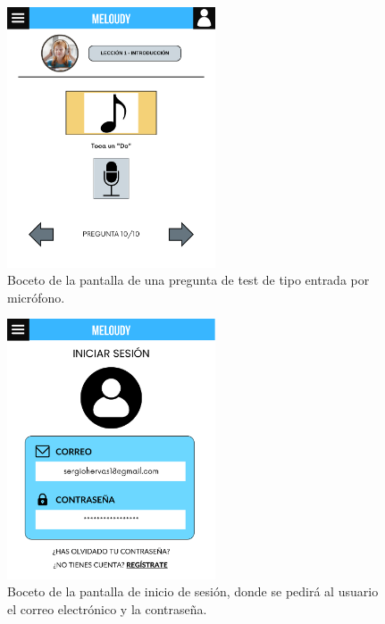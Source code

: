 \begin{figure}[H]
    \centering
    \centerline{\includegraphics[width=0.55\textwidth, frame]{imagenes/c6/8.png}}
    \caption{Boceto de la pantalla de una pregunta de test de tipo entrada por micrófono.}
    \label{fig:microfono}
\end{figure}

\begin{figure}[H]
    \centering
    \centerline{\includegraphics[width=0.55\textwidth, frame]{imagenes/c6/9.png}}
    \caption{Boceto de la pantalla de inicio de sesión, donde se pedirá al usuario el correo electrónico y la contraseña.}
    \label{fig:login}
\end{figure}

